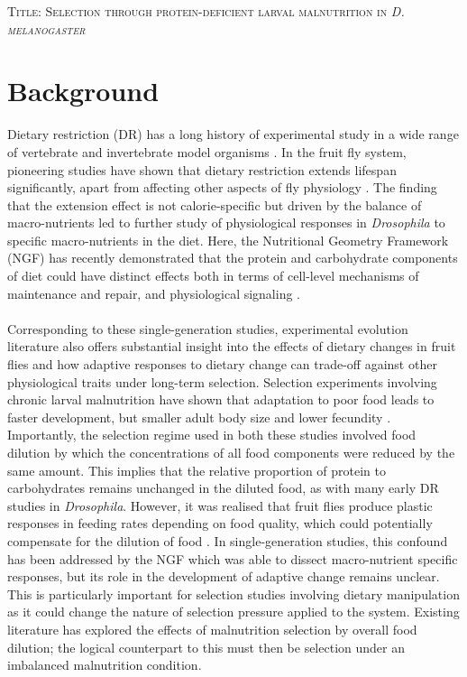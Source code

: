 \documentclass[12pt, onecolumn]{article}
\date{\empty}
\begin{document}
	\textsc{\large Title: Selection through protein-deficient larval malnutrition in \textit{D. melanogaster}}
    \section*{Background}
	Dietary restriction (DR) has a long history of experimental study in a wide range of vertebrate and invertebrate model organisms \cite{Nakagawa}. In the fruit fly system, pioneering studies have shown that dietary restriction extends lifespan significantly, apart from affecting other aspects of fly physiology \cite{Skorupa2008}. The finding that the extension effect is not calorie-specific but driven by the balance of macro-nutrients \cite{Mair2005} led to further study of physiological responses in \textit{Drosophila} to specific macro-nutrients in the diet. Here, the Nutritional Geometry Framework (NGF) has recently demonstrated that the protein and carbohydrate components of diet could have distinct effects both in terms of cell-level mechanisms of maintenance and repair, and physiological signaling \cite{Tatar2014}.

	\paragraph{\empty} Corresponding to these single-generation studies, experimental evolution literature also offers substantial insight into the effects of dietary changes in fruit flies and how adaptive responses to dietary change can trade-off against other physiological traits under long-term selection. Selection experiments involving chronic larval malnutrition have shown that adaptation to poor food leads to faster development, but smaller adult body size and lower fecundity \cite{Kolss2009,Vijendravarma2012}. Importantly, the selection regime used in both these studies involved food dilution by which the concentrations of all food components were reduced by the same amount. This implies that the relative proportion of protein to carbohydrates remains unchanged in the diluted food, as with many early DR studies in \textit{Drosophila}. However, it was realised that fruit flies produce plastic responses in feeding rates depending on food quality, which could potentially compensate for the dilution of food \cite{Carvalho2005,Wong2009}. In single-generation studies, this confound has been addressed by the NGF which was able to dissect macro-nutrient specific responses, but its role in the development of adaptive change remains unclear. This is particularly important for selection studies involving dietary manipulation as it could change the nature of selection pressure applied to the system. Existing literature has explored the effects of malnutrition selection by overall food dilution; the logical counterpart to this must then be selection under an imbalanced malnutrition condition.
\end{document}
